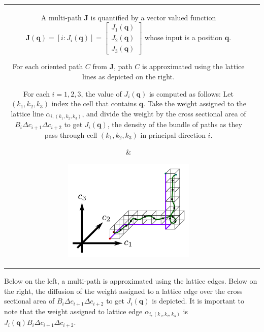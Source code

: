 \documentclass{book}
\begin{document}
\begin{tabular}{cc}
\parbox{0.5\textwidth}{
A multi-path \(\mathbf{J}\) is quantified by a vector valued function \(\mathbf{J}(\mathbf{q}) = [i : J_i(\mathbf{q})] = \begin{bmatrix} J_1(\mathbf{q}) \\ J_2(\mathbf{q}) \\ J_3(\mathbf{q}) \end{bmatrix}\) whose input is a position \(\mathbf{q}\). 

For each oriented path \(C\) from \(\mathbf{J}\), path \(C\) is approximated using the lattice lines as depicted on the right. 

For each \(i = 1, 2, 3\), the value of \(J_i(\mathbf{q})\) is computed as follows: Let \((k_1, k_2, k_3)\) index the cell that contains \(\mathbf{q}\). Take the weight assigned to the lattice line \(\alpha_{i,(k_1,k_2,k_3)}\), and divide the weight by the cross sectional area of \(B_i \Delta c_{i+1} \Delta c_{i+2}\) to get \(J_i(\mathbf{q})\), the density of the bundle of paths as they pass through cell \((k_1, k_2, k_3)\) in principal direction \(i\).
} & \parbox{0.5\textwidth}{
\includegraphics[width = 0.5\textwidth]{Coordinate_systems/approximating_a_path}
}
\end{tabular}

Below on the left, a multi-path is approximated using the lattice edges. Below on the right, the diffusion of the weight assigned to a lattice edge over the cross sectional area of \(B_i \Delta c_{i+1} \Delta c_{i+2}\) to get \(J_i(\mathbf{q})\) is depicted. It is important to note that the weight assigned to lattice edge \(\alpha_{i,(k_1,k_2,k_3)}\) is \(J_i(\mathbf{q}) B_i \Delta c_{i+1} \Delta c_{i+2}\).  
\end{document}
